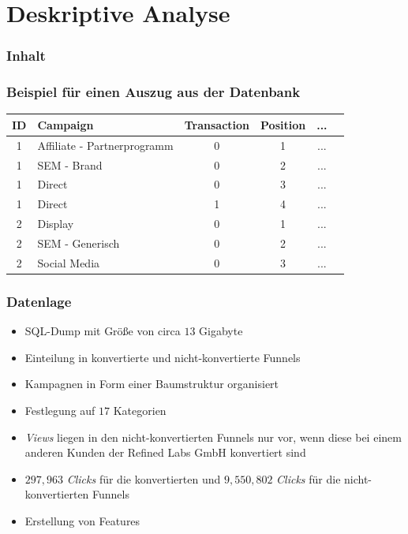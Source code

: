 \section{Deskriptive Analyse}

\begin{frame}\frametitle{Inhalt}
\end{frame}

\begin{frame}\frametitle{Beispiel für einen Auszug aus der Datenbank}
	\begin{table}[H]
		\begin{center}
			\begin{tabular}{|c|l|c|c|c|c|}
				\hline
				ID & Campaign 									 & Transaction & Position & ... \\ \hline\hline
				1  & Affiliate - Partnerprogramm & 0					 & 1		    & ... \\ \hline
				1  & SEM - Brand                 & 0					 & 2		    & ... \\ \hline
				1  & Direct                      & 0					 & 3		    & ... \\ \hline
				1  & Direct                      & 1					 & 4		    & ... \\ \hline
				2  & Display                     & 0					 & 1		    & ... \\ \hline
				2  & SEM - Generisch             & 0					 & 2		    & ... \\ \hline
				2  & Social Media                & 0					 & 3		    & ... \\ \hline
			\end{tabular} 
		\end{center}
	\end{table}
\end{frame}

\begin{frame}\frametitle{Datenlage} 
	\begin{itemize}
		\item SQL-Dump mit Größe von circa $13$ Gigabyte
		\item Einteilung in konvertierte und nicht-konvertierte Funnels
		\item Kampagnen in Form einer Baumstruktur organisiert
		\item Festlegung auf $17$ Kategorien
		\item \textit{Views} liegen in den nicht-konvertierten Funnels nur vor, wenn diese bei einem anderen Kunden der Refined Labs GmbH konvertiert sind
		\item $ 297,963 $ \textit{Clicks} für die konvertierten und $ 9,550,802 $ \textit{Clicks} für die nicht-konvertierten Funnels
		\item Erstellung von Features
	\end{itemize}
\end{frame}

